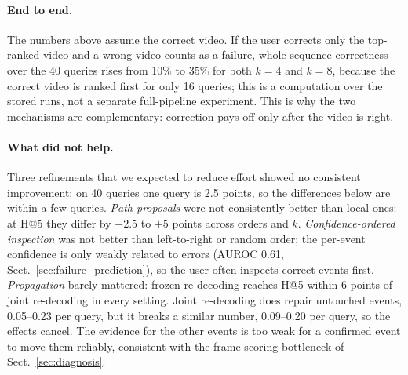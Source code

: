 \paragraph{End to end.}
The numbers above assume the correct video.
If the user corrects only the top-ranked video and a wrong video counts as a failure, whole-sequence correctness over the 40 queries rises from 10\% to 35\% for both $k=4$ and $k=8$, because the correct video is ranked first for only 16 queries; this is a computation over the stored runs, not a separate full-pipeline experiment.
This is why the two mechanisms are complementary: correction pays off only after the video is right.

\paragraph{What did not help.}
Three refinements that we expected to reduce effort showed no consistent improvement; on 40 queries one query is 2.5 points, so the differences below are within a few queries.
\emph{Path proposals} were not consistently better than local ones: at H@5 they differ by $-2.5$ to $+5$ points across orders and $k$.
\emph{Confidence-ordered inspection} was not better than left-to-right or random order; the per-event confidence is only weakly related to errors (AUROC 0.61, Sect.~\ref{sec:failure_prediction}), so the user often inspects correct events first.
\emph{Propagation} barely mattered: frozen re-decoding reaches H@5 within 6 points of joint re-decoding in every setting.
Joint re-decoding does repair untouched events, 0.05--0.23 per query, but it breaks a similar number, 0.09--0.20 per query, so the effects cancel.
The evidence for the other events is too weak for a confirmed event to move them reliably, consistent with the frame-scoring bottleneck of Sect.~\ref{sec:diagnosis}.
